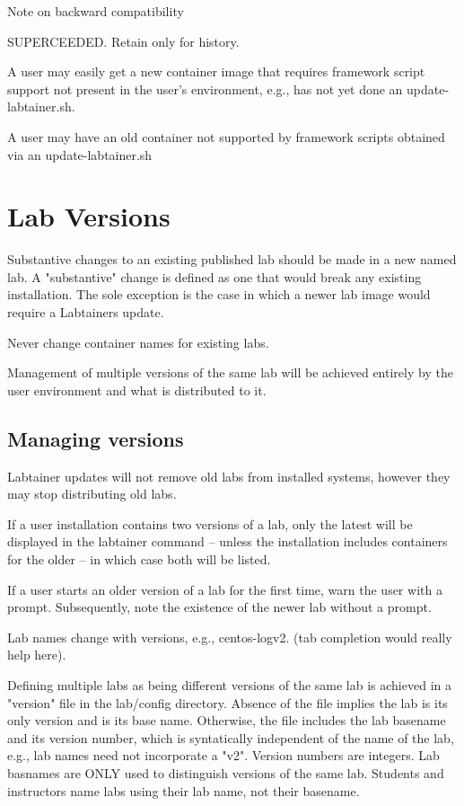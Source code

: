 Note on backward compatibility

SUPERCEEDED.  Retain only for history.

A user may easily get a new container image that requires framework
script support not present in the user's environment, e.g., has
not yet done an update-labtainer.sh.  

A user may have an old container not supported by framework scripts
obtained via an update-labtainer.sh

\section{Lab Versions}
Substantive changes to an existing published lab should be made in
a new named lab.  A "substantive" change is defined as one that would
break any existing installation.  The sole exception is the case in 
which a newer lab image would require a Labtainers update.

Never change container names for existing labs.

Management of multiple versions of the same lab will be achieved entirely
by the user environment and what is distributed to it.

\subsection{Managing versions}
Labtainer updates will not remove old labs from installed systems, however 
they may stop distributing old labs.

If a user installation contains two versions of a lab, only the latest will
be displayed in the labtainer command -- unless the installation includes
containers for the older -- in which case both will be listed.

If a user starts an older version of a lab for the first time, warn the user
with a prompt.  Subsequently, note the existence of the newer lab without a prompt.

Lab names change with versions, e.g., centos-logv2.  (tab completion would really
help here).

Defining multiple labs as being different versions of the same lab is achieved
in a "version" file in the lab/config directory.  Absence of the file implies the
lab is its only version and is its base name. Otherwise, the file includes the 
lab basename and its version number, which is syntatically independent of the name
of the lab, e.g., lab names need not incorporate a "v2".  Version numbers are integers.
Lab basnames are ONLY used to distinguish versions of the same lab.   Students and
instructors name labs using their lab name, not their basename.

